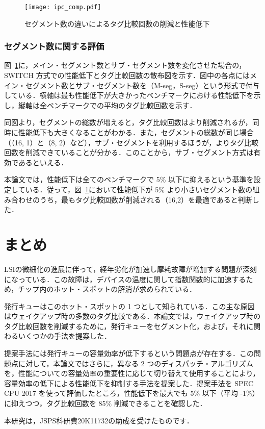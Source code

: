 \documentclass[submit,techrep,noauthor]{ipsj}
\newcommand{\fig}[1]{{図~\ref{fig:#1}}}
\begin{document}
\begin{figure}[htb]
  \centering
  \texttt{[image: ipc\_comp.pdf]}
  \caption{セグメント数の違いによるタグ比較回数の削減と性能低下}
  \label{fig:ipc_comp}
\end{figure}

\subsubsection{セグメント数に関する評価}
\label{sec:ipc_comp}
\fig{ipc_comp}に，メイン・セグメント数とサブ・セグメント数を変化させた場合の，SWITCH 方式での性能低下とタグ比較回数の散布図を示す．図中の各点にはメイン・セグメント数とサブ・セグメント数を（M-seg，S-seg）という形式で付与している．横軸は最も性能低下が大きかったベンチマークにおける性能低下を示し，縦軸は全ベンチマークでの平均のタグ比較回数を示す．

同図より，セグメントの総数が増えると，タグ比較回数はより削減されるが，同時に性能低下も大きくなることがわかる．また，セグメントの総数が同じ場合（（16, 1）と（8, 2）など），サブ・セグメントを利用するほうが，よりタグ比較回数を削減できていることが分かる．このことから，サブ・セグメント方式は有効であるといえる．

本論文では，性能低下は全てのベンチマークで 5\% 以下に抑えるという基準を設定している．従って，\fig{ipc_comp}において性能低下が 5\% より小さいセグメント数の組み合わせのうち，最もタグ比較回数が削減される（16,2）を最適であると判断した．

\section{まとめ}
\label{sec:summary}
LSIの微細化の進展に伴って，経年劣化が加速し摩耗故障が増加する問題が深刻になっている．この故障は，デバイスの温度に関して指数関数的に加速するため，チップ内のホット・スポットの解消が求められている．

発行キューはこのホット・スポットの 1 つとして知られている．この主な原因はウェイクアップ時の多数のタグ比較である．本論文では，ウェイクアップ時のタグ比較回数を削減するために，発行キューをセグメント化，および，それに関わるいくつかの手法を提案した．

提案手法には発行キューの容量効率が低下するという問題点が存在する．この問題点に対して，本論文ではさらに，異なる 2 つのディスパッチ・アルゴリズムを，性能についての容量効率の重要性に応じて切り替えて使用することにより，容量効率の低下による性能低下を抑制する手法を提案した．提案手法を SPEC CPU 2017 を使って評価したところ，性能低下を最大でも 5\% 以下（平均 -1\%）に抑えつつ，タグ比較回数を 85\% 削減できることを確認した．

\begin{acknowledgment}
本研究は，JSPS科研費20K11732の助成を受けたものです．
\end{acknowledgment}



\end{document}
